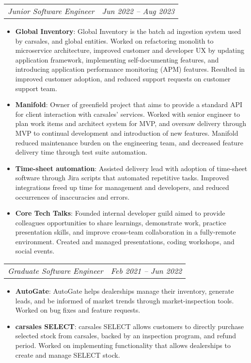 \documentclass[letterpaper,11pt]{article}
\makeatletter
\newcommand{\resumeItem}[2]{
  \item\small{
    \textbf{#1}{: #2 \vspace{-2pt}}
  }
}
\newcommand{\resumeSubSubheading}[2]{
    \begin{tabular*}{0.97\textwidth}{l@{\extracolsep{\fill}}r}
      \textit{\small#1} & \textit{\small #2} \\
    \end{tabular*}\vspace{-5pt}
}
\newcommand{\resumeItemListStart}{\begin{itemize}}
\newcommand{\resumeItemListEnd}{\end{itemize}\vspace{-5pt}}
\makeatother
\begin{document}
   \resumeSubSubheading
    {Junior Software Engineer}{Jun 2022 -- Aug 2023}
    \resumeItemListStart
       \resumeItem{Global Inventory}
         {Global Inventory is the batch ad ingestion system used by carsales, and global entities. Worked on refactoring monolith to microservice architecture, improved customer and developer UX by updating application framework, implementing self-documenting features, and introducing application performance monitoring (APM) features. Resulted in improved customer adoption, and reduced support requests on customer support team.}
       \resumeItem{Manifold}
         {Owner of greenfield project that aims to provide a standard API for client interaction with carsales’ services. Worked with senior engineer to plan work items and architect system for MVP, and oversaw delivery through MVP to continual development and introduction of new features. Manifold reduced maintenance burden on the engineering team, and decreased feature delivery time through test suite automation.}
       \resumeItem{Time-sheet automation}
         {Assisted delivery lead with adoption of time-sheet software through Jira scripts that automated repetitive tasks. Improved integrations freed up time for management and developers, and reduced occurrences of inaccuracies and errors.}
       \resumeItem{Core Tech Talks}
         {Founded internal developer guild aimed to provide colleagues opportunities to share learnings, demonstrate work, practice presentation skills, and improve cross-team collaboration in a fully-remote environment. Created and managed presentations, coding workshops, and social events.}
    \resumeItemListEnd

   \resumeSubSubheading
    {Graduate Software Engineer}{Feb 2021 -- Jun 2022}
    \resumeItemListStart
       \resumeItem{AutoGate}
         {AutoGate helps dealerships manage their inventory, generate leads, and be informed of market trends through market-inspection tools. Worked on bug fixes and feature requests.}
       \resumeItem{carsales SELECT}
         {carsales SELECT allows customers to directly purchase selected stock from carsales, backed by an inspection program, and refund period. Worked on implementing functionality that allows dealerships to create and manage SELECT stock.}
    \resumeItemListEnd

\end{document}

